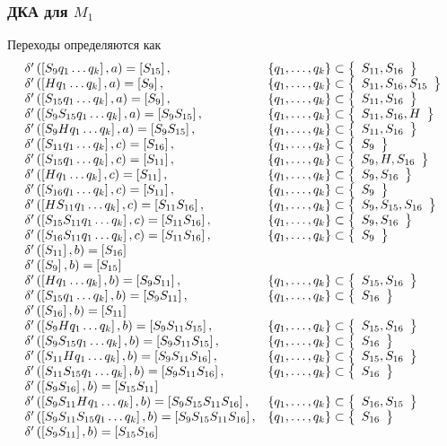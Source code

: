 \subsubsection{ДКА для \(M_1\)}
Переходы определяются как
\begin{align*}
	\begin{array}{ll}
		\gendelta{S_9}{a}{S_{15}}{\maqa}                               \\
		\gendelta{H}{a}{S_9}{\maqa,S_{15}}                             \\
		\gendelta{S_{15}}{a}{S_9}{\maqa}                               \\
		\gendelta{S_9S_{15}}{a}{S_9S_{15}}{\maqa,H}                    \\
		\gendelta{S_9H}{a}{S_9S_{15}}{\maqa}                           \\
		\gendelta{S_{11}}{c}{S_{16}}{\maqc}                            \\
		\gendelta{S_{15}}{c}{S_{11}}{\maqc, H, S_{16}}                 \\
		\gendelta{H}{c}{S_{11}}{\maqc, S_{16}}                         \\
		\gendelta{S_{16}}{c}{S_{11}}{\maqc}                            \\
		\gendelta{HS_{11}}{c}{S_{11}S_{16}}{\maqc,S_{15},S_{16}}       \\
		\gendelta{S_{15}S_{11}}{c}{S_{11}S_{16}}{\maqc,S_{16}}         \\
		\gendelta{S_{16}S_{11}}{c}{S_{11}S_{16}}{\maqc}                \\
		\gendelta{S_{11}}{b}{S_{16}}{}                                 \\
		\gendelta{S_{9}}{b}{S_{15}}{}                                  \\
		\gendelta{H}{b}{S_9S_{11}}{S_{15},S_{16}}                      \\
		\gendelta{S_{15}}{b}{S_9S_{11}}{S_{16}}                        \\
		\gendelta{S_{16}}{b}{S_{11}}{}                                 \\
		\gendelta{S_9H}{b}{S_9S_{11}S_{15}}{S_{15},S_{16}}             \\
		\gendelta{S_9S_{15}}{b}{S_9S_{11}S_{15}}{S_{16}}               \\
		\gendelta{S_{11}H}{b}{S_9S_{11}S_{16}}{S_{15},S_{16}}          \\
		\gendelta{S_{11}S_{15}}{b}{S_9S_{11}S_{16}}{S_{16}}            \\
		\gendelta{S_9S_{16}}{b}{S_{15}S_{11}}{}                        \\
		\gendelta{S_9S_{11}H}{b}{S_9S_{15}S_{11}S_{16}}{S_{16},S_{15}} \\
		\gendelta{S_9S_{11}S_{15}}{b}{S_9S_{15}S_{11}S_{16}}{S_{16}}   \\
		\gendelta{S_9S_{11}}{b}{S_{15}S_{16}}{}
	\end{array}
\end{align*}

